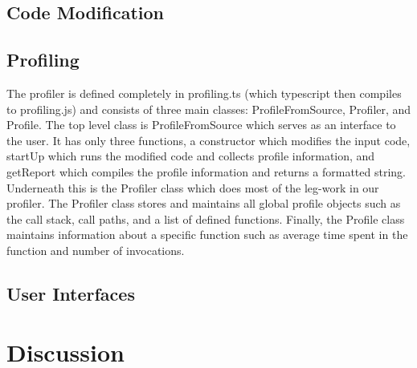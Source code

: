 \documentclass[11pt]{article}
\begin{document}
\subsection{Code Modification}
	
	

\subsection{Profiling}

	The profiler is defined completely in profiling.ts (which typescript then compiles to profiling.js) 
and consists of three main classes: ProfileFromSource, Profiler, and Profile. The top level class 
is ProfileFromSource which serves as an interface to the user. It has only three functions, a constructor 
which modifies the input code, startUp which runs the modified code and collects profile information, 
and getReport which compiles the profile information and returns a formatted string. Underneath this 
is the Profiler class which does most of the leg-work in our profiler. The Profiler class stores and 
maintains all global profile objects such as the call stack, call paths, and a list of defined functions. 
Finally, the Profile class maintains information about a specific function such as average time spent in 
the function and number of invocations.

\subsection{User Interfaces}

\section{Discussion}
\end{document}
